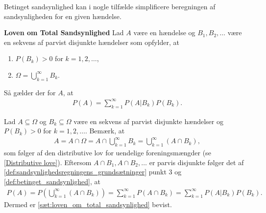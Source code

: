 Betinget sandsynlighed kan i nogle tilfælde simplificere beregningen af sandsynligheden for en given hændelse. 

\begin{minipage}\textwidth
\begin{thmx} \textbf{Loven om Total Sandsynlighed} \label{sæt:loven_om_total_sandsynlighed} %
\newline
Lad $A$ være en hændelse og $B_1,B_2,\dots$ være en sekvens af parvist disjunkte hændelser som opfylder, at
\begin{enumerate}
\item $P(B_k)>0$ for $k=1,2,\dots$,
\item $\Omega=\displaystyle\bigcup_{k=1}^\infty B_k$.
\end{enumerate}
Så gælder der for $A$, at
\begin{align*}
    P(A)=\sum_{k=1}^\infty P(A|B_k)P(B_k).
\end{align*}
\end{thmx}
\end{minipage}
\begin{bev} \textbf{} %
\newline
Lad $A\subseteq \Omega$ og $B_k \subseteq \Omega $ være en sekvens af parvist disjunkte hændelser og $P(B_k)>0$ for $k=1,2,\dots$. Bemærk, at
\begin{align*}
    A=A\cap \Omega=A\cap\bigcup_{k=1}^\infty B_k=\bigcup_{k=1}^\infty(A\cap B_k),
\end{align*}
som følger af den distributive lov for uendelige foreningsmængder (se \autoref{Distributive love}). 
Eftersom $A\cap B_1,A\cap B_2,\dots$ er parvis disjunkte følger det af \autoref{def:sandsynlighedsregningens_grundsætninger} punkt 3 og \autoref{def:betinget_sandsynlighed}, at
\begin{align*}
    P(A)=P\left(\bigcup_{k=1}^\infty(A\cap B_k)\right) =\sum_{k=1}^\infty P(A\cap B_k)=\sum_{k=1}^\infty P(A|B_k)P(B_k).
\end{align*}
Dermed er \autoref{sæt:loven_om_total_sandsynlighed} bevist.
\end{bev}


